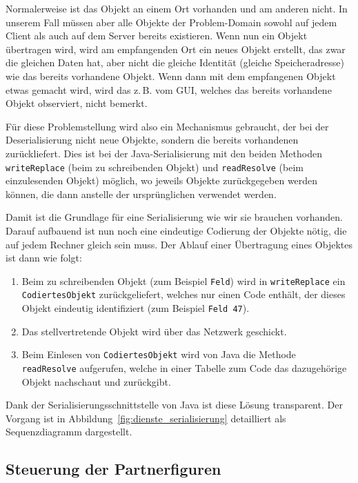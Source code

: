 \documentclass[12pt,halfparskip]{scrartcl}
\begin{document}
Normalerweise ist das Objekt an einem Ort vorhanden und am anderen nicht. In unserem Fall müssen aber alle Objekte der Problem-Domain sowohl auf jedem Client als auch auf dem Server bereits existieren. Wenn nun ein Objekt übertragen wird, wird am empfangenden Ort ein neues Objekt erstellt, das zwar die gleichen Daten hat, aber nicht die gleiche Identität (gleiche Speicheradresse) wie das bereits vorhandene Objekt. Wenn dann mit dem empfangenen Objekt etwas gemacht wird, wird das z.\,B. vom GUI, welches das bereits vorhandene Objekt observiert, nicht bemerkt.

Für diese Problemstellung wird also ein Mechanismus gebraucht, der bei der Deserialisierung nicht neue Objekte, sondern die bereits vorhandenen zurückliefert. Dies ist bei der Java-Serialisierung mit den beiden Methoden \texttt{writeReplace} (beim zu schreibenden Objekt) und \texttt{readResolve} (beim einzulesenden Objekt) möglich, wo jeweils Objekte zurückgegeben werden können, die dann anstelle der ursprünglichen verwendet werden.

Damit ist die Grundlage für eine Serialisierung wie wir sie brauchen vorhanden. Darauf aufbauend ist nun noch eine eindeutige Codierung der Objekte nötig, die auf jedem Rechner gleich sein muss. Der Ablauf einer Übertragung eines Objektes ist dann wie folgt:

\begin{enumerate}
	\item Beim zu schreibenden Objekt (zum Beispiel \texttt{Feld}) wird in \texttt{writeReplace} ein \texttt{CodiertesObjekt} zurückgeliefert, welches nur einen Code enthält, der dieses Objekt eindeutig identifiziert (zum Beispiel \texttt{Feld 47}).
	\item Das stellvertretende Objekt wird über das Netzwerk geschickt.
	\item Beim Einlesen von \texttt{CodiertesObjekt} wird von Java die Methode \texttt{readResolve} aufgerufen, welche in einer Tabelle zum Code das dazugehörige Objekt nachschaut und zurückgibt.
\end{enumerate}

Dank der Serialisierungsschnittstelle von Java ist diese Lösung transparent. Der Vorgang ist in Abbildung~\vref{fig:dienste_serialisierung} detailliert als Sequenzdiagramm dargestellt.

\subsection{Steuerung der Partnerfiguren}
\end{document}
